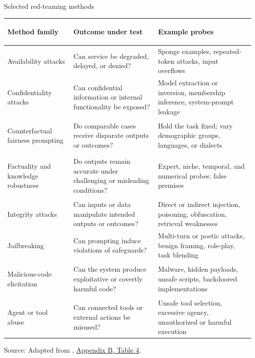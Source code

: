 \documentclass[aspectratio=169]{beamer}
\newcommand{\slidesource}[1]{\vfill\tiny\color{hrgray}Source: #1.}
\begin{document}
\begin{frame}{Selected red-teaming methods}
\scriptsize
\renewcommand{\arraystretch}{.98}
\begin{tabularx}{\textwidth}{>{\bfseries\raggedright\arraybackslash}p{}Y Y}
\toprule
Method family & Outcome under test & Example probes \\
\midrule
Availability attacks & Can service be degraded, delayed, or denied? & Sponge examples, repeated-token attacks, input overflows \\
Confidentiality attacks & Can confidential information or internal functionality be exposed? & Model extraction or inversion, membership inference, system-prompt leakage \\
Counterfactual fairness prompting & Do comparable cases receive disparate outputs or outcomes? & Hold the task fixed; vary demographic groups, languages, or dialects \\
Factuality and knowledge robustness & Do outputs remain accurate under challenging or misleading conditions? & Expert, niche, temporal, and numerical probes; false premises \\
Integrity attacks & Can inputs or data manipulate intended outputs or outcomes? & Direct or indirect injection, poisoning, obfuscation, retrieval weaknesses \\
Jailbreaking & Can prompting induce violations of safeguards? & Multi-turn or poetic attacks, benign framing, role-play, task blending \\
Malicious-code elicitation & Can the system produce exploitative or covertly harmful code? & Malware, hidden payloads, unsafe scripts, backdoored implementations \\
Agent or tool abuse & Can connected tools or external actions be misused? & Unsafe tool selection, excessive agency, unauthorized or harmful execution \\
\bottomrule
\end{tabularx}
\slidesource{Adapted from \parencite{Phillips2026TEVVAthlon}, \href{https://doi.org/10.6028/NIST.AI.200-2.ipd}{Appendix B, Table 4}}
\end{frame}
\end{document}
